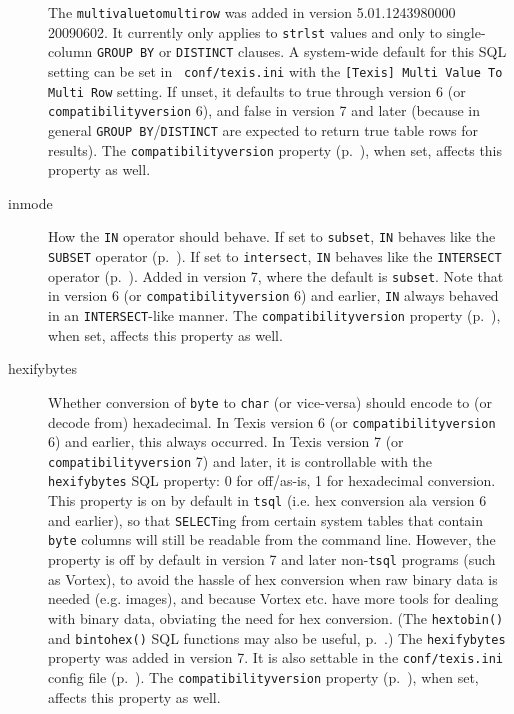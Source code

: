 \begin{description}
  The \verb`multivaluetomultirow` was added in version 5.01.1243980000
  20090602.  It currently only applies to \verb`strlst` values and
  only to single-column {\tt GROUP BY} or {\tt DISTINCT} clauses.  A
  system-wide default for this SQL setting can be set in {\tt
    conf/texis.ini} with the {\tt [Texis] Multi Value To Multi Row}
  setting.  If unset, it defaults to true through version 6 (or
  \verb`compatibilityversion` 6), and false in version 7 and later
  (because in general {\tt GROUP BY}/{\tt DISTINCT} are expected to
  return true table rows for results).  The
  \verb`compatibilityversion` property
  (p.~\pageref{SqlPropertyCompatibilityVersion}), when set, affects
  this property as well.

\item[inmode]
\label{InmodeProperty}
  How the {\tt IN} operator should behave.  If set to \verb`subset`,
  {\tt IN} behaves like the {\tt SUBSET} operator
  (p.~\pageref{SubsetOperator}).  If set to \verb`intersect`, {\tt IN}
  behaves like the {\tt INTERSECT} operator
  (p.~\pageref{IntersectOperator}).  Added in version 7, where the
  default is \verb`subset`.  Note that in version 6 (or
  \verb`compatibilityversion` 6) and earlier, {\tt IN} always behaved
  in an {\tt INTERSECT}-like manner.  The \verb`compatibilityversion`
  property (p.~\pageref{SqlPropertyCompatibilityVersion}), when set,
  affects this property as well.

\item[hexifybytes]
\label{hexifybytesProperty}

  Whether conversion of \verb`byte` to \verb`char` (or vice-versa)
  should encode to (or decode from) hexadecimal.  In Texis version 6
  (or \verb`compatibilityversion` 6) and earlier, this always
  occurred.  In Texis version 7 (or \verb`compatibilityversion` 7) and
  later, it is controllable with the \verb`hexifybytes` SQL property:
  0 for off/as-is, 1 for hexadecimal conversion.  This property is on
  by default in \verb`tsql` (i.e. hex conversion ala version 6 and
  earlier), so that \verb`SELECT`ing from certain system tables that
  contain \verb`byte` columns will still be readable from the command
  line.  However, the property is off by default in version 7 and
  later non-\verb`tsql` programs (such as Vortex), to avoid the hassle
  of hex conversion when raw binary data is needed (e.g. images), and
  because Vortex etc. have more tools for dealing with binary data,
  obviating the need for hex conversion.  (The \verb`hextobin()` and
  \verb`bintohex()` SQL functions may also be useful,
  p.~\pageref{bintohexSqlFunction}.)  The \verb`hexifybytes` property
  was added in version 7.  It is also settable in the
  \verb`conf/texis.ini` config file (p.~\pageref{tcHexifyBytes}).  The
  \verb`compatibilityversion` property
  (p.~\pageref{SqlPropertyCompatibilityVersion}), when set, affects
  this property as well.


\end{description}
